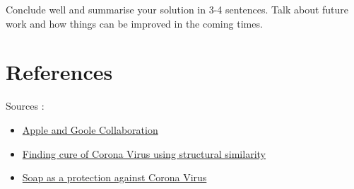 \documentclass[10pt,twocolumn,letterpaper]{article}
\begin{document}
Conclude well and summarise your solution in 3-4 sentences. 
Talk about future work and how things can be improved in the coming times.

\section*{References}
Sources :
\begin{itemize}
    \item \href{https://www.apple.com/in/newsroom/2020/04/apple-and-google-partner-on-covid-19-contact-tracing-technology/}{Apple and Goole Collaboration}
    \item \href{https://science.sciencemag.org/content/368/6489/409}{Finding cure of Corona Virus using structural similarity}
    \item \href{https://www.thehindu.com/sci-tech/science/how-does-soap-use-help-in-tackling-covid-19/article31070630.ece}{Soap as a protection against Corona Virus}
\end{itemize}
\end{document}
